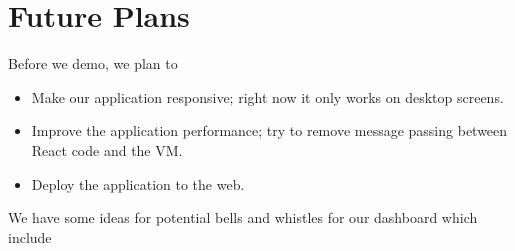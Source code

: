 \section*{Future Plans}

Before we demo, we plan to

\begin{itemize}
  \item Make our application responsive; right now it only works on desktop screens.
  \item Improve the application performance; try to remove message passing between React code and the VM.
  \item Deploy the application to the web.
\end{itemize}

We have some ideas for potential bells and whistles for our dashboard which include

